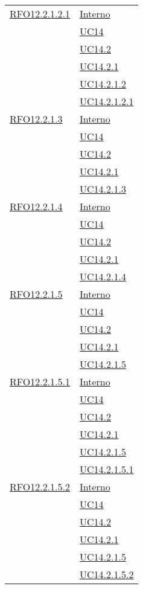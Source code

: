 \begin{longtable}{|>{\centering}m{5cm}|m{5cm}<{\centering}|}
 \hyperlink{RFO12.2.1.2.1}{RFO12.2.1.2.1} 
 & \hyperlink{Interno}{Interno}\\
& \hyperref[UC14]{UC14}\\
& \hyperref[UC14.2]{UC14.2}\\
& \hyperref[UC14.2.1]{UC14.2.1}\\
& \hyperref[UC14.2.1.2]{UC14.2.1.2}\\
& \hyperref[UC14.2.1.2.1]{UC14.2.1.2.1}\\\hline

 \hyperlink{RFO12.2.1.3}{RFO12.2.1.3} 
 & \hyperlink{Interno}{Interno}\\
& \hyperref[UC14]{UC14}\\
& \hyperref[UC14.2]{UC14.2}\\
& \hyperref[UC14.2.1]{UC14.2.1}\\
& \hyperref[UC14.2.1.3]{UC14.2.1.3}\\\hline

  \hyperlink{RFO12.2.1.4}{RFO12.2.1.4} 
 & \hyperlink{Interno}{Interno}\\
& \hyperref[UC14]{UC14}\\
& \hyperref[UC14.2]{UC14.2}\\
& \hyperref[UC14.2.1]{UC14.2.1}\\
& \hyperref[UC14.2.1.4]{UC14.2.1.4}\\\hline

 \hyperlink{RFO12.2.1.5}{RFO12.2.1.5} 
 & \hyperlink{Interno}{Interno}\\
& \hyperref[UC14]{UC14}\\
& \hyperref[UC14.2]{UC14.2}\\
& \hyperref[UC14.2.1]{UC14.2.1}\\
& \hyperref[UC14.2.1.5]{UC14.2.1.5}\\\hline

 \hyperlink{RFO12.2.1.5.1}{RFO12.2.1.5.1} 
 & \hyperlink{Interno}{Interno}\\
& \hyperref[UC14]{UC14}\\
& \hyperref[UC14.2]{UC14.2}\\
& \hyperref[UC14.2.1]{UC14.2.1}\\
& \hyperref[UC14.2.1.5]{UC14.2.1.5}\\
& \hyperref[UC14.2.1.5.1]{UC14.2.1.5.1}\\\hline

 \hyperlink{RFO12.2.1.5.2}{RFO12.2.1.5.2} 
 & \hyperlink{Interno}{Interno}\\
& \hyperref[UC14]{UC14}\\
& \hyperref[UC14.2]{UC14.2}\\
& \hyperref[UC14.2.1]{UC14.2.1}\\
& \hyperref[UC14.2.1.5]{UC14.2.1.5}\\
& \hyperref[UC14.2.1.5.2]{UC14.2.1.5.2}\\\hline


\end{longtable}

